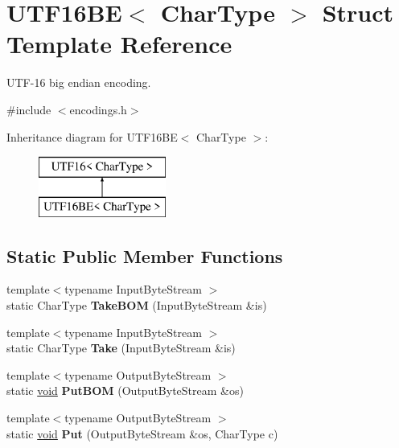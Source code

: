 \hypertarget{struct_u_t_f16_b_e}{}\section{U\+T\+F16\+B\+E$<$ Char\+Type $>$ Struct Template Reference}
\label{struct_u_t_f16_b_e}


U\+T\+F-\/16 big endian encoding.  




{\ttfamily \#include $<$encodings.\+h$>$}

Inheritance diagram for U\+T\+F16\+B\+E$<$ Char\+Type $>$\+:\begin{figure}[H]
\begin{center}
\leavevmode
\includegraphics[height=2.000000cm]{struct_u_t_f16_b_e}
\end{center}
\end{figure}
\subsection*{Static Public Member Functions}
\begin{DoxyCompactItemize}
\item 
\hypertarget{struct_u_t_f16_b_e_a5d5184a373149c69b4b8baf8507f9591}{}{\footnotesize template$<$typename Input\+Byte\+Stream $>$ }\\static Char\+Type {\bfseries Take\+B\+O\+M} (Input\+Byte\+Stream \&is)\label{struct_u_t_f16_b_e_a5d5184a373149c69b4b8baf8507f9591}

\item 
\hypertarget{struct_u_t_f16_b_e_a671ca76d54f45aa5f62eb86c4e69738a}{}{\footnotesize template$<$typename Input\+Byte\+Stream $>$ }\\static Char\+Type {\bfseries Take} (Input\+Byte\+Stream \&is)\label{struct_u_t_f16_b_e_a671ca76d54f45aa5f62eb86c4e69738a}

\item 
\hypertarget{struct_u_t_f16_b_e_ae109dda1ad7955049589885ea5a13652}{}{\footnotesize template$<$typename Output\+Byte\+Stream $>$ }\\static \hyperlink{_s_d_l__audio_8h_a52835ae37c4bb905b903cbaf5d04b05f}{void} {\bfseries Put\+B\+O\+M} (Output\+Byte\+Stream \&os)\label{struct_u_t_f16_b_e_ae109dda1ad7955049589885ea5a13652}

\item 
\hypertarget{struct_u_t_f16_b_e_ab0f964c3ec9ac6cc47f2875ae112dbfe}{}{\footnotesize template$<$typename Output\+Byte\+Stream $>$ }\\static \hyperlink{_s_d_l__audio_8h_a52835ae37c4bb905b903cbaf5d04b05f}{void} {\bfseries Put} (Output\+Byte\+Stream \&os, Char\+Type c)\label{struct_u_t_f16_b_e_ab0f964c3ec9ac6cc47f2875ae112dbfe}

\end{DoxyCompactItemize}
